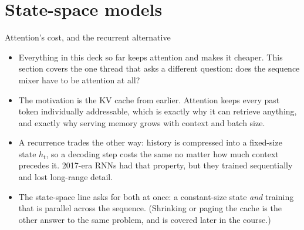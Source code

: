 \section{State-space models}

\begin{frame}[t]{Attention's cost, and the recurrent alternative}
  \begin{itemize}\itemsep0.45em
    \item Everything in this deck so far keeps attention and makes it cheaper. This section covers the one thread that asks a different question: does the sequence mixer have to be attention at all?
    \item The motivation is the KV cache from earlier. Attention keeps every past token individually addressable, which is exactly why it can retrieve anything, and exactly why serving memory grows with context and batch size.
    \item A recurrence trades the other way: history is compressed into a fixed-size state $h_t$, so a decoding step costs the same no matter how much context precedes it. 2017-era RNNs had that property, but they trained sequentially and lost long-range detail.
    \item The state-space line asks for both at once: a constant-size state \emph{and} training that is parallel across the sequence. (Shrinking or paging the cache is the other answer to the same problem, and is covered later in the course.)
  \end{itemize}
\end{frame}

